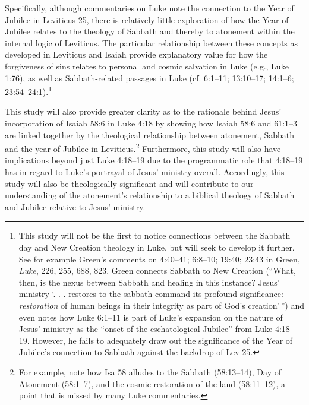 \documentclass[A4,12pt]{article}
\begin{document}
Specifically, although commentaries on Luke note the connection to the Year of Jubilee in Leviticus 25, there is relatively little exploration of how the Year of Jubilee relates to the theology of Sabbath and thereby to atonement within the internal logic of Leviticus. The particular relationship between these concepts as developed in Leviticus and Isaiah provide explanatory value for how the forgiveness of sins relates to personal and cosmic salvation in Luke (e.g., Luke 1:76), as well as Sabbath-related passages in Luke (cf. 6:1--11; 13:10--17; 14:1--6; 23:54--24:1).\footnote
  {
    This study will not be the first to notice connections between the Sabbath day and New Creation theology in Luke, but will seek to develop it further. See for example Green's comments on 4:40--41; 6:8--10; 19:40; 23:43 in Green, \emph{Luke}, 226, 255, 688, 823. Green connects Sabbath to New Creation (``What, then, is the nexus between Sabbath and healing in this instance?  Jesus' ministry `. . . restores to the sabbath command its profound significance: \emph{restoration} of human beings in their integrity as part of God's creation'\,'') and even notes how Luke 6:1--11 is part of Luke's expansion on the nature of Jesus' ministry as the ``onset of the eschatological Jubilee'' from Luke 4:18--19. However, he fails to adequately draw out the significance of the Year of Jubilee's connection to Sabbath against the backdrop of Lev 25.
  }

This study will also provide greater clarity as to the rationale behind Jesus' incorporation of Isaiah 58:6 in Luke 4:18 by showing how Isaiah 58:6 and 61:1--3 are linked together by the theological relationship between atonement, Sabbath and the year of Jubilee in Leviticus.\footnote
  {
    For example, note how Isa 58 alludes to the Sabbath (58:13--14), Day of Atonement (58:1--7), and the cosmic restoration of the land (58:11--12), a point that is missed by many Luke commentaries.
  } 
Furthermore, this study will also have implications beyond just Luke 4:18--19 due to the programmatic role that 4:18--19 has in regard to Luke's portrayal of Jesus' ministry overall. Accordingly, this study will also be theologically significant and will contribute to our understanding of the atonement's relationship to a biblical theology of Sabbath and Jubilee relative to Jesus' ministry.

\printbibliography[heading=bibintoc]




\end{document}
